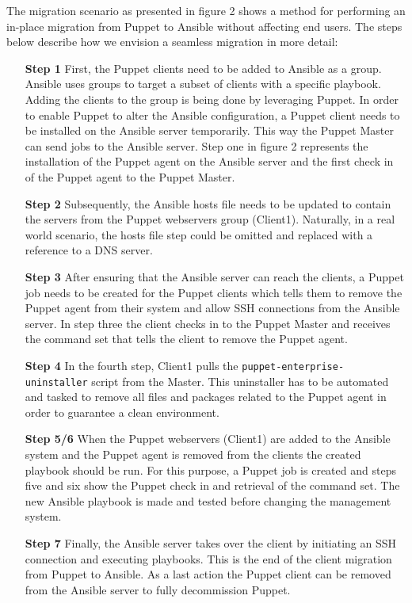 \noindent
The migration scenario as presented in figure 2 shows a method for performing an in-place migration from Puppet to Ansible without affecting end users. The steps below describe how we envision a seamless migration in more detail:

\indent
\begin{itemize}
    \item[\bf Step 1] First, the Puppet clients need to be added to Ansible as a group. Ansible uses groups to target a subset of clients with a specific playbook. Adding the clients to the group is being done by leveraging Puppet. In order to enable Puppet to alter the Ansible configuration, a Puppet client needs to be installed on the Ansible server temporarily. This way the Puppet Master can send jobs to the Ansible server. Step one in figure 2 represents the installation of the Puppet agent on the Ansible server and the first check in of the Puppet agent to the Puppet Master.

    \item[\bf Step 2] Subsequently, the Ansible hosts file needs to be updated to contain the servers from the Puppet webservers group (Client1). Naturally, in a real world scenario, the hosts file step could be omitted and replaced with a reference to a DNS server.

    \item[\bf Step 3] After ensuring that the Ansible server can reach the clients, a Puppet job needs to be created for the Puppet clients which tells them to remove the Puppet agent from their system and allow SSH connections from the Ansible server. In step three the client checks in to the Puppet Master and receives the command set that tells the client to remove the Puppet agent.

	\item[\bf Step 4]
    In the fourth step, Client1 pulls the \texttt{puppet-enterprise-uninstaller} script from the Master. This uninstaller has to be automated and tasked to remove all files and packages related to the Puppet agent in order to guarantee a clean environment.

    \item[\bf Step 5/6] When the Puppet webservers (Client1) are added to the Ansible system and the Puppet agent is removed from the clients the created playbook should be run. For this purpose, a Puppet job is created and steps five and six show the Puppet check in and retrieval of the command set. The new Ansible playbook is made and tested before changing the management system.
    
    \item[\bf Step 7] Finally, the Ansible server takes over the client by initiating an SSH connection and executing playbooks. This is the end of the client migration from Puppet to Ansible. As a last action the Puppet client can be removed from the Ansible server to fully decommission Puppet.
\end{itemize}

